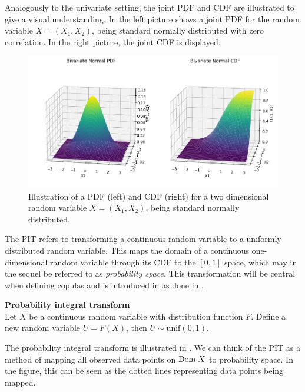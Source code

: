 Analogously to the univariate setting, the joint \gls{PDF} and \gls{CDF} are illustrated to give a visual understanding. In  the left picture shows a joint \gls{PDF} for the random variable $X = (X_1, X_2)$, being standard normally distributed with zero correlation. In the right picture, the joint \gls{CDF} is displayed. 

\begin{figure}
    \centering
    \includegraphics[width=1\linewidth]{3Theory/pictures/MultivariatePDFandCDF.png}
    \caption{Illustration of a \gls{PDF} (left) and \gls{CDF} (right) for a two dimensional random variable $X = (X_1,X_2)$, being standard normally distributed.}
    \label{fig:JointCDFandPDF}
\end{figure}


The \gls{PIT} refers to transforming a continuous random variable to a uniformly distributed random variable. 
This maps the domain of a continuous one-dimensional random variable through its \gls{CDF} to the $[0,1]$ space, which may in the sequel be referred to as \emph{probability space}. This transformation will be central when defining copulas and is introduced in  as done in \citet[p.~27]{Danielsson2011}. 

\begin{theorem}\label{the:PIT} \textbf{Probability integral transform} \\
    Let $X$ be a continuous random variable with distribution function $F$. Define a new random variable $U = F(X)$, then $U \sim \mathrm{unif}(0,1)$. 
\end{theorem}

The probability integral transform is illustrated in . We can think of the \gls{PIT} as a method of mapping all observed data points on $\mathrm{Dom \;} X$  to probability space. In the figure, this can be seen as the dotted lines representing data points being mapped. 




